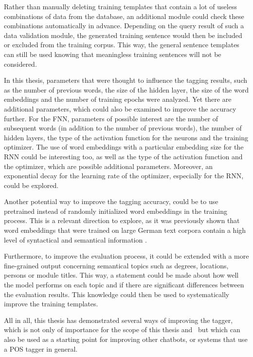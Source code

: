 Rather than manually deleting training templates that contain a lot of useless combinations of data from the database, an additional module could check these combinations automatically in advance. Depending on the query result of such a data validation module, the generated training sentence would then be included or excluded from the training corpus. This way, the general sentence templates can still be used knowing that meaningless training sentences will not be considered.

In this thesis, parameters that were thought to influence the tagging results, such as the number of previous words, the size of the hidden layer, the size of the word embeddings and the number of training epochs were analyzed. Yet there are additional parameters, which could also be examined to improve the accuracy further. For the FNN, parameters of possible interest are the number of subsequent words (in addition to the number of previous words), the number of hidden layers, the type of the activation function for the neurons and the training optimizer. The use of word embeddings with a particular embedding size for the RNN could be interesting too, as well as the type of the activation function and the optimizer, which are possible additional parameters. Moreover, an exponential decay for the learning rate of the optimizer, especially for the RNN, could be explored.

Another potential way to improve the tagging accuracy, could be to use pretrained instead of randomly initialized word embeddings in the training process. This is a relevant direction to explore, as it was previously shown that word embeddings that were trained on large German text corpora contain a high level of syntactical and semantical information \cite{mueller2015}.

Furthermore, to improve the evaluation process, it could be extended with a more fine-grained output concerning semantical topics such as degrees, locations, persons or module titles. This way, a statement could be made about how well the model performs on each topic and if there are significant differences between the evaluation results. This knowledge could then be used to systematically improve the training templates.

All in all, this thesis has demonstrated several ways of improving the tagger, which is not only of importance for the scope of this thesis and \Alex\ but which can also be used as a starting point for improving other chatbots, or systems that use a POS tagger in general.

